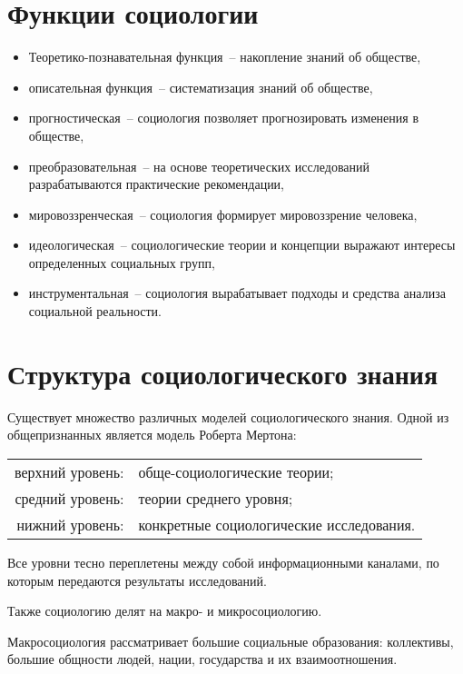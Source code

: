 \section{Функции социологии}

  \begin{itemize}
    \item Теоретико-познавательная функция~-- накопление знаний об обществе,
    \item описательная функция~-- систематизация знаний об обществе,
    \item прогностическая~-- социология позволяет прогнозировать изменения в
      обществе,
    \item преобразовательная~-- на основе теоретических исследований
      разрабатываются практические рекомендации,
    \item мировоззренческая~-- социология формирует мировоззрение человека,
    \item идеологическая~-- социологические теории и концепции выражают интересы
      определенных социальных групп,
    \item инструментальная~-- социология вырабатывает подходы и средства анализа
      социальной реальности.
  \end{itemize}

\section{Структура социологического знания}

  Существует множество различных моделей социологического знания. Одной из
  общепризнанных является модель Роберта Мертона:
  \begin{center}
    \begin{tabular}{rl}
      верхний уровень: & обще-социологические теории; \\
      средний уровень: & теории среднего уровня; \\
       нижний уровень: & конкретные социологические исследования. \\
    \end{tabular}
  \end{center}

  Все уровни тесно переплетены между собой информационными каналами, по которым
  передаются результаты исследований.

  \bigskip

  Также социологию делят на макро- и микросоциологию.

  Макросоциология рассматривает большие социальные образования: коллективы,
  большие общности людей, нации, государства и их взаимоотношения.


